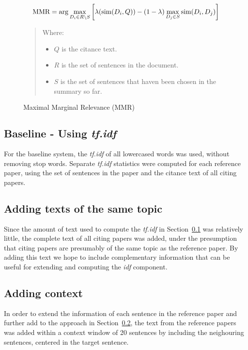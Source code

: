 \documentclass[11pt]{article}
\begin{document}
\begin{figure*}
$$
\hbox{MMR} = \arg\max_{D_i\in R\setminus S}\left[\lambda(\hbox{sim}(D_i,Q)) -
(1-\lambda) \max_{D_j\in S} \hbox{sim}(D_i,D_j)\right]
$$  
\begin{quote}
Where:
\begin{itemize}
\item $Q$ is the citance text.
\item $R$ is the set of sentences in the document.
\item $S$ is the set of sentences that haven been chosen in the
  summary so far.  
\end{itemize}
\end{quote}
  \caption{Maximal Marginal Relevance (MMR)}
  \label{fig:mmr}
\end{figure*}


\subsection{Baseline - Using \emph{tf.idf}}
\label{sec:tfidf}
For the baseline system, the \emph{tf.idf} of all lowercased words was used, 
without removing stop words. Separate \emph{tf.idf} statistics were computed 
for each reference paper, using the set of sentences in the paper and the citance 
text of all citing papers.

\subsection{Adding texts of the same topic}
\label{sec:topics}
Since the amount of text used to compute the \emph{tf.idf} in 
Section~\ref{sec:tfidf} was relatively little, the complete text of all citing 
papers was added, under the presumption that citing papers are presumably of 
the same topic as the reference paper. By adding this text we hope to include 
complementary information that can be useful for extending and computing 
the \emph{idf} component. 

\subsection{Adding context}
\label{sec:context}
In order to  extend the information of each sentence in the reference paper 
and further add to the approach in Section~\ref{sec:topics}, the text from 
the reference papers was added within a context window of 20 sentences by 
including the neighouring sentences, centered in the target sentence.
\end{document}
